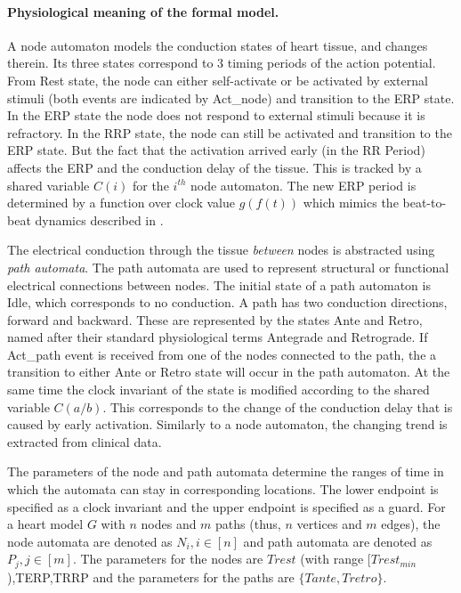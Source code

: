 \paragraph{Physiological meaning of the formal model.}
A node automaton models the conduction states of heart tissue, and changes therein. 
Its three states correspond to 3 timing periods of the action potential. 
From \textsf{Rest} state, the node can either self-activate or be activated by external stimuli (both events are indicated by Act\_node) and transition to the \textsf{ERP} state. 
In the \textsf{ERP} state the node does not respond to external stimuli because it is refractory. 
In the \textsf{RRP} state, the node can still be activated and transition to the \textsf{ERP} state.
But the fact that the activation arrived early (in the RR Period) affects the ERP and the conduction delay of the tissue.  
This is tracked by a shared variable $C(i)$ for the $i^{th}$ node automaton. 
The new ERP period is determined by a function over clock value $g(f(t))$ which mimics the beat-to-beat dynamics described in \cite{josephson}. 

The electrical conduction through the tissue \emph{between} nodes is abstracted using \emph{path automata}. 
The path automata are used to represent structural or functional electrical connections between nodes. 
The initial state of a path automaton is \textsf{Idle}, which corresponds to no conduction. 
A path has two conduction directions, forward and backward.
These are represented by the states Ante and Retro, named after their standard physiological terms Antegrade and Retrograde.
If \textsf{Act\_path} event is received from one of the nodes connected to the path, the a transition to either \textsf{Ante} or \textsf{Retro} state will occur in the path automaton. 
At the same time the clock invariant of the state is modified according to the shared variable $C(a/b)$. 
This corresponds to the change of the conduction delay that is caused by early activation. 
Similarly to a node automaton, the changing trend is extracted from clinical data. 

The parameters of the node and path automata determine the ranges of time in which the automata can stay in corresponding locations. 
The lower endpoint is specified as a clock invariant and the upper endpoint is specified as a guard. 
For a heart model $G$ with $n$ nodes and $m$ paths (thus, $n$ vertices and $m$ edges), the node automata are denoted as $N_i, i\in[n]$ and path automata are denoted as $P_j,j\in[m]$. 
The parameters for the nodes are $Trest$ (with range $[Trest_{min}$),TERP,TRRP and the parameters for the paths are $\{Tante,Tretro\}$. 

